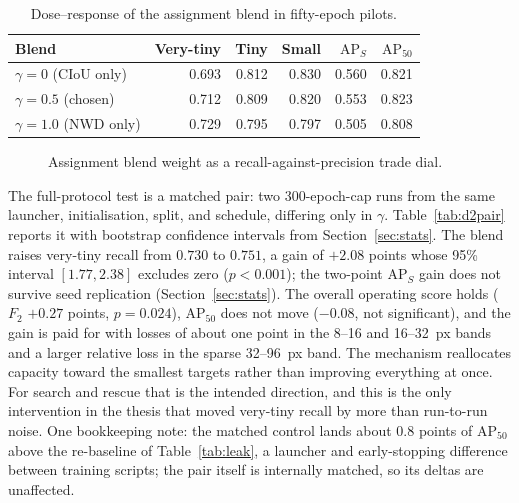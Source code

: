 \begin{table}[tbp]
  \centering
  \caption{Dose--response of the assignment blend in fifty-epoch pilots.}
  \label{tab:gamma}
  \begin{tabular}{@{}l r r r r r@{}}
    \toprule
    \bfseries\boldmath Blend& \bfseries\boldmath Very-tiny& \bfseries\boldmath Tiny& \bfseries\boldmath Small& \bfseries\boldmath $\mathrm{AP}_S$& \bfseries\boldmath $\mathrm{AP}_{50}$\\
    \midrule
    $\gamma=0$ (CIoU only)   & 0.693 & 0.812 & 0.830 & 0.560 & 0.821 \\
    $\gamma=0.5$ (chosen)    & 0.712 & 0.809 & 0.820 & 0.553 & 0.823 \\
    $\gamma=1.0$ (NWD only)  & 0.729 & 0.795 & 0.797 & 0.505 & 0.808 \\
    \bottomrule
  \end{tabular}
\end{table}

\begin{figure}[tbp]
  \centering
  \caption{Assignment blend weight as a recall-against-precision trade dial.}
  \label{fig:gammadose}
\end{figure}

The full-protocol test is a matched pair: two 300-epoch-cap runs
from the same launcher, initialisation, split, and schedule, differing only in
$\gamma$. Table~\ref{tab:d2pair} reports it with bootstrap confidence
intervals from Section~\ref{sec:stats}. The blend raises very-tiny
recall from $0.730$ to $0.751$, a gain of $\mathbf{+2.08}$ points whose 95\%
interval $[1.77, 2.38]$ excludes zero ($p<0.001$); the two-point
$\mathrm{AP}_S$ gain does not survive seed replication
(Section~\ref{sec:stats}). The overall operating score
holds ($F_2$ $+0.27$ points, $p=0.024$), $\mathrm{AP}_{50}$ does not move
($-0.08$, not significant), and the gain is paid for with losses of about one
point in the 8--16 and 16--32~px bands and a larger relative loss in the
sparse 32--96~px band. The mechanism reallocates capacity toward the smallest
targets rather than improving everything at once. For search and rescue that
is the intended direction, and this is the only intervention in the thesis
that moved very-tiny recall by more than run-to-run noise. One bookkeeping note: the
matched control lands about $0.8$ points of $\mathrm{AP}_{50}$ above the
re-baseline of Table~\ref{tab:leak}, a launcher and early-stopping difference
between training scripts; the pair itself is internally matched, so its deltas
are unaffected.

